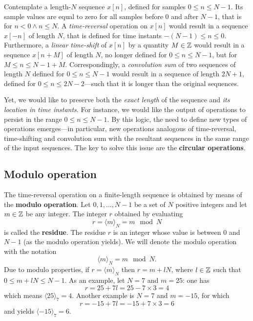 \documentclass[\documentfontsize, twocolumn]{\classname}
\begin{document}
Contemplate a length-$N$ sequence $x[n]$, defined for samples $0\leq n \leq N-1$. Its sample values are equal to zero for all samples before $0$ and after $N-1$, that is for $n < 0 \wedge n \leq N$. A \emph{time-reversal} operation on $x[n]$ would result in a sequence $x[-n]$ of length $N$, that is defined for time instants $-(N-1) \leq n \leq 0$. Furthermore, a \emph{linear time-shift} of $x[n]$ by a quantity $M \in \mathbb Z$ would result in a sequence $x[n+M]$ of length $N$, no longer defined for $0 \leq n \leq N-1$, but for $M \leq n \leq N-1 + M$. Correspondingly, a \emph{convolution sum} of two sequences of length $N$ defined for $0 \leq n \leq N-1$ would result in a sequence of length $2N + 1$, defined for $0 \leq n \leq 2N-2$---such that it is longer than the original sequences.

Yet, we would like to preserve both the \emph{exact length} of the sequence and \emph{its location in time instants}. For instance, we would like the output of operations to persist in the range $0 \leq n \leq N-1$. By this logic, the need to define new types of operations emerges---in particular, new operations analogous of time-reversal, time-shifting and convolution sum with the resultant sequences in the same range of the input sequences. The key to solve this issue are the \textbf{circular operations}.

\subsection{Modulo operation}
The time-reversal operation on a finite-length sequence is obtained by means of the \textbf{modulo operation}. Let $0,1,\dots, N-1$ be a set of $N$ positive integers and let $m \in \mathbb Z$ be any integer. The integer $r$ obtained by evaluating
\begin{equation}\label{eqn:moduloOperation}
    r = \langle m \rangle_N = m \mod N
\end{equation}
is called the \textbf{residue}. The residue $r$ is an integer whose value is between $0$ and $N-1$ (as the modulo operation yields). We will denote the modulo operation with the notation \[ \langle m \rangle_N = m \mod N. \] Due to modulo properties, if $r = \langle m \rangle_N$ then $r = m + lN$, where $l \in \mathbb Z$ such that $0 \leq m + lN \leq N-1$.
As an example, let $N=7$ and $m = 25$: one has
\[
    r = 25 + 7l = 25 - 7 \times 3 = 4
\]
which means $\langle 25 \rangle_7 = 4$. Another example is $N=7$ and $m=-15$, for which
\[
    r = -15 + 7l = -15 + 7 \times 3 = 6
\]
and yields $\langle -15 \rangle_7 = 6$.
\end{document}
